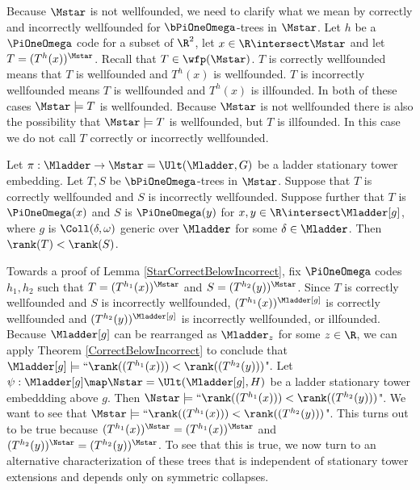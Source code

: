 \documentclass[oneside,12pt]{amsart}
\begin{document}
Because $\Mstar$ is not wellfounded, we need to clarify what we mean by correctly and incorrectly wellfounded
for $\bPiOneOmega$-trees in $\Mstar$.
Let $h$ be a $\PiOneOmega$ code for
a subset of $\R^2$, let $x\in\R\intersect\Mstar$ and let  $T=(T^h(x))^{\Mstar}$.
Recall that $T\in\wfp(\Mstar)$.
$T$ is correctly wellfounded means that $T$ is wellfounded and $T^h(x)$ is wellfounded.
$T$ is incorrectly wellfounded means $T$ is wellfounded and $T^h(x)$ is illfounded.
In both of these cases $\Mstar\models T$ is wellfounded. Because $\Mstar$ is not wellfounded there is also
the possibility that $\Mstar\models T$ is wellfounded, but $T$ is illfounded. In this case we do not
call $T$ correctly or incorrectly wellfounded.

\begin{lemma}
\label{StarCorrectBelowIncorrect}
Let $\pi:\Mladder\to\Mstar=\Ult(\Mladder,G)$ be a ladder stationary tower embedding.
Let $T,S$ be $\bPiOneOmega$-trees in $\Mstar$.
Suppose that $T$ is correctly wellfounded and
$S$ is incorrectly wellfounded. Suppose further that $T$ is $\PiOneOmega(x)$
and $S$ is $\PiOneOmega(y)$ for $x,y\in\R\intersect\Mladder[g]$,
where $g$ is $\Coll(\delta,\omega)$ generic over $\Mladder$ for some $\delta\in\Mladder$.
Then $\rank(T) < \rank(S)$.
\end{lemma}

Towards a proof of Lemma \ref{StarCorrectBelowIncorrect},
fix $\PiOneOmega$ codes $h_1, h_2$
such that $T=(T^{h_1}(x))^{\Mstar}$ and
$S=(T^{h_2}(y))^{\Mstar}$. Since $T$ is correctly wellfounded
and $S$ is incorrectly wellfounded, $(T^{h_1}(x))^{\Mladder[g]}$
is correctly wellfounded and
$(T^{h_2}(y))^{\Mladder[g]}$
is incorrectly wellfounded, or illfounded.
Because $\Mladder[g]$ can be rearranged as $\Mladder_z$ for some $z\in\R$,
we can apply Theorem \ref{CorrectBelowIncorrect} to conclude that
$\Mladder[g]\models \text{``}\rank((T^{h_1}(x))) < \rank((T^{h_2}(y)))$".
Let $\psi:\Mladder[g]\map\Nstar=\Ult(\Mladder[g],H)$ be a ladder stationary tower embeddding
above $g$. Then $\Nstar\models \text{``}\rank((T^{h_1}(x))) < \rank((T^{h_2}(y)))$".
We want to see that $\Mstar\models \text{``}\rank((T^{h_1}(x))) < \rank((T^{h_2}(y)))$".
This turns out to be true because $(T^{h_1}(x))^{\Nstar}=(T^{h_1}(x))^{\Mstar}$
and $(T^{h_2}(y))^{\Nstar}=(T^{h_2}(y))^{\Mstar}$. To see that this is true, we
now turn to an alternative characterization of these trees that is independent
of stationary tower extensions and depends only on symmetric collapses.
\end{document}
